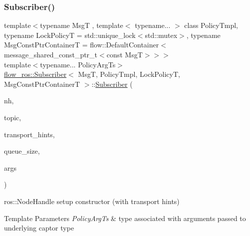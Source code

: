 \subsubsection{\texorpdfstring{Subscriber()}{Subscriber()}\hspace{0.1cm}{\footnotesize\ttfamily [2/3]}}
{\footnotesize\ttfamily template$<$typename MsgT , template$<$ typename... $>$ class Policy\+Tmpl, typename Lock\+PolicyT  = std\+::unique\+\_\+lock$<$std\+::mutex$>$, typename Msg\+Const\+Ptr\+ContainerT  = flow\+::\+Default\+Container$<$message\+\_\+shared\+\_\+const\+\_\+ptr\+\_\+t$<$const Msg\+T$>$$>$$>$ \\
template$<$typename... Policy\+Arg\+Ts$>$ \\
\hyperlink{classflow__ros_1_1_subscriber}{flow\+\_\+ros\+::\+Subscriber}$<$ MsgT, Policy\+Tmpl, Lock\+PolicyT, Msg\+Const\+Ptr\+ContainerT $>$\+::\hyperlink{classflow__ros_1_1_subscriber}{Subscriber} (\begin{DoxyParamCaption}\item[{ros\+::\+Node\+Handle \&}]{nh,  }\item[{const std\+::string \&}]{topic,  }\item[{const ros\+::\+Transport\+Hints \&}]{transport\+\_\+hints,  }\item[{const std\+::uint32\+\_\+t}]{queue\+\_\+size,  }\item[{Policy\+Arg\+Ts \&\&...}]{args }\end{DoxyParamCaption})\hspace{0.3cm}{\ttfamily [inline]}}



{\ttfamily ros\+::\+Node\+Handle} setup constructor (with transport hints) 


\begin{DoxyTemplParams}{Template Parameters}
{\em Policy\+Arg\+Ts} & type associated with arguments passed to underlying captor type\\
\hline
\end{DoxyTemplParams}

